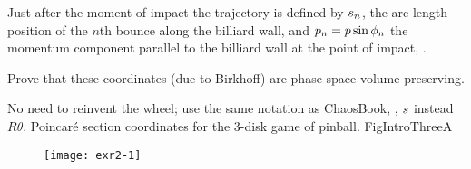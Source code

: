 {Just after
the moment of impact the trajectory  is defined by $s_n$, the arc-length
position of the $n$th bounce along the billiard wall, and
$p_n= p \sin \phi_n$
the momentum component parallel to the billiard wall
at the point of impact,
.

Prove that these coordinates (due to Birkhoff)
are phase space volume
preserving.

No need to reinvent the wheel;
use the same notation as ChaosBook, \ie, $s$ instead
$R \theta$.
%
 {}{ Poincar\'e section coordinates for the
3-disk game of pinball.
    }{FigIntroThreeA}

}

\begin{figure}
\centering
\texttt{[image: exr2-1]}
\end{figure}


